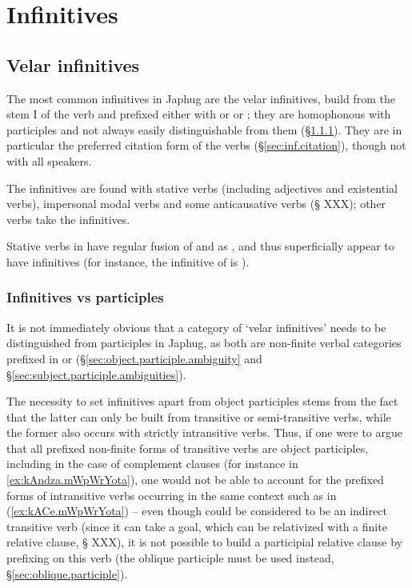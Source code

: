\section{Infinitives}

 
\subsection{Velar infinitives} \label{sec:velar.inf}
The most common infinitives in Japhug are the velar infinitives, build from the stem I of the verb and prefixed either with  or or ; they are homophonous with participles and not always easily distinguishable from them (§\ref{sec:infinitives.participles}). They are in particular the preferred citation form of the verbs (§\ref{sec:inf.citation}), though not with all speakers.
 
The  infinitives are found with stative verbs (including adjectives and existential verbs), impersonal modal verbs and some anticausative verbs (§ XXX); other verbs take the  infinitives. 

Stative verbs in  have regular fusion of  and  as , and thus superficially appear to have  infinitives (for instance, the infinitive of  is  ).

\subsubsection{Infinitives vs participles} \label{sec:infinitives.participles}
It is not immediately obvious that a category of `velar infinitives' needs to be distinguished from participles in Japhug, as both are non-finite verbal categories prefixed in  or  (§\ref{sec:object.participle.ambiguity} and §\ref{sec:subject.participle.ambiguities}). 

The necessity to set  infinitives apart from object participles stems from the fact that the latter can only be built from transitive or semi-transitive verbs, while the former also occurs with strictly intransitive verbs. Thus, if one were to argue that all prefixed non-finite forms of transitive verbs are object participles, including in the case of complement clauses (for instance  in \ref{ex:kAndza.mWpWrYota}), one would not be able to account for the prefixed forms of intransitive verbs occurring in the same context such as  in (\ref{ex:kACe.mWpWrYota}) -- even though  could be considered to be an indirect transitive verb (since it can take a goal, which can be relativized with a finite relative clause, § XXX), it is not possible to build a participial relative clause by prefixing  on this verb (the oblique participle  must be used instead, §\ref{sec:oblique.participle}).

